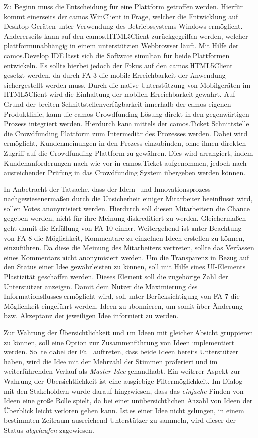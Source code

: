 Zu Beginn muss die Entscheidung für eine Plattform getroffen werden. Hierfür kommt einerseits der camos.WinClient in Frage, welcher die Entwicklung auf Desktop-Geräten unter Verwendung des Betriebssystems Windows ermöglicht. Andererseits kann auf den camos.HTML5Client zurückgegriffen werden, welcher plattformunabhängig in einem unterstützten Webbrowser läuft. Mit Hilfe der camos.Develop IDE lässt sich die Software simultan für beide Plattformen entwickeln. Es sollte hierbei jedoch der Fokus auf den camos.HTML5Client gesetzt werden, da durch \ac{FA}-3 die mobile Erreichbarkeit der Anwendung sichergestellt werden muss. Durch die native Unterstützung von Mobilgeräten im HTML5Client wird die Einhaltung der mobilen Erreichbarkeit gewahrt. Auf Grund der breiten Schnittstellenverfügbarkeit innerhalb der camos eigenen Produktlinie, kann die camos Crowdfunding Lösung direkt in den gegenwärtigen Prozess integriert werden. Hierdurch kann mittels der camos.Ticket Schnittstelle die Crowdfunding Plattform zum Intermediär des Prozesses werden. Dabei wird ermöglicht, Kundenmeinungen in den Prozess einzubinden, ohne ihnen direkten Zugriff auf die Crowdfunding Plattform zu gewähren. Dies wird arrangiert, indem Kundenanforderungen nach wie vor in camos.Ticket aufgenommen, jedoch nach ausreichender Prüfung in das Crowdfunding System übergeben werden können.

In Anbetracht der Tatsache, dass der Ideen- und Innovationsprozess nachgewiesenermaßen durch die Unsicherheit einiger Mitarbeiter beeinflusst wird, sollen Votes anonymisiert werden. Hierdurch soll diesen Mitarbeitern die Chance gegeben werden, nicht für ihre Meinung diskreditiert zu werden. Gleichermaßen geht damit die Erfüllung von \ac{FA}-10 einher. Weitergehend ist unter Beachtung von \ac{FA}-8 die Möglichkeit, Kommentare zu einzelnen Ideen erstellen zu können, einzuführen. Da diese die Meinung des Mitarbeiters vertreten, sollte das Verfassen eines Kommentars nicht anonymisiert werden. Um die Transparenz in Bezug auf den Status einer Idee gewährleisten zu können, soll mit Hilfe eines UI-Elements Plastizität geschaffen werden. Dieses Element soll die zugehörige Zahl der Unterstützer anzeigen. Damit dem Nutzer die Maximierung des Informationsflusses ermöglicht wird, soll unter Berücksichtigung von \ac{FA}-7 die Möglichkeit eingeführt werden, Ideen zu abonnieren, um somit über Änderung bzw. Akzeptanz der jeweiligen Idee informiert zu werden. 

Zur Wahrung der Übersichtlichkeit und um Ideen mit gleicher Absicht gruppieren zu können, soll eine Option zur Zusammenführung von Ideen implementiert werden. Sollte dabei der Fall auftreten, dass beide Ideen bereits Unterstützer haben, wird die Idee mit der Mehrzahl der Stimmen präferiert und im weiterführenden Verlauf als \emph{Master-Idee} gehandhabt. Ein weiterer Aspekt zur Wahrung der Übersichtlichkeit ist eine ausgiebige Filtermöglichkeit. Im Dialog mit den Stakeholdern wurde darauf hingewiesen, dass das \emph{einfache} Finden von Ideen eine große Rolle spielt, da bei einer unübersichtlichen Anzahl von Ideen der Überblick leicht verloren gehen kann. Ist es einer Idee nicht gelungen, in einem bestimmten Zeitraum ausreichend Unterstützer zu sammeln, wird dieser der Status \emph{abgelaufen} zugewiesen. 

